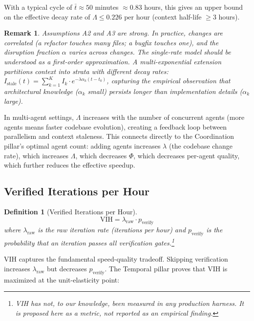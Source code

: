 \documentclass[11pt, a4paper, logo, copyright]{googledeepmind}
\newtheorem{definition}{Definition}[section]
\newtheorem*{remark}{Remark}
\begin{document}
With a typical cycle of $\bar{t} \approx 50$ minutes $\approx 0.83$ hours, this gives an upper bound on the effective decay rate of $\Lambda \leq 0.226$ per hour (context half-life $\geq 3$ hours).

\begin{remark}
Assumptions A2 and A3 are strong. In practice, changes are correlated (a refactor touches many files; a bugfix touches one), and the disruption fraction $\alpha$ varies across changes. The single-rate model should be understood as a first-order approximation. A multi-exponential extension partitions context into strata with different decay rates: $I_{\mathrm{stale}}(t) = \sum_{k=1}^K I_k \cdot e^{-\lambda\alpha_k(t - t_0)}$, capturing the empirical observation that architectural knowledge ($\alpha_k$ small) persists longer than implementation details ($\alpha_k$ large).
\end{remark}

In multi-agent settings, $\Lambda$ increases with the number of concurrent agents (more agents means faster codebase evolution), creating a feedback loop between parallelism and context staleness. This connects directly to the Coordination pillar's optimal agent count: adding agents increases $\lambda$ (the codebase change rate), which increases $\Lambda$, which decreases $\Phi$, which decreases per-agent quality, which further reduces the effective speedup.

\subsection{Verified Iterations per Hour}

\begin{definition}[Verified Iterations per Hour]
\label{def:vih}
\begin{equation}
    \text{VIH} = \lambda_{\text{raw}} \cdot p_{\text{verify}}
\end{equation}
where $\lambda_{\text{raw}}$ is the raw iteration rate (iterations per hour) and $p_{\text{verify}}$ is the probability that an iteration passes all verification gates.\footnote{VIH has not, to our knowledge, been measured in any production harness. It is proposed here as a metric, not reported as an empirical finding.}
\end{definition}

VIH captures the fundamental speed-quality tradeoff. Skipping verification increases $\lambda_{\text{raw}}$ but decreases $p_{\text{verify}}$. The Temporal pillar proves that VIH is maximized at the unit-elasticity point:
\end{document}
